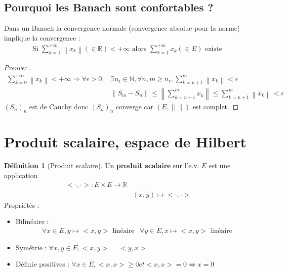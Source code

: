 \documentclass{article}
\theoremstyle{plain}%
\theoremstyle{definition}
\newtheorem{defn}{Définition}[section]
\theoremstyle{remark}
\begin{document}
\subsection{Pourquoi les Banach sont confortables ?}

Dans un Banach la convergence normale (convergence absolue pour la norme) implique la convergence : 
\begin{align*}
	\text{Si } \sum_{k=1}^{+\infty } \left\| x_k \right\| (\in \mathbb{R}) < + \infty \text{ alors } \sum_{k=1}^{+\infty} x_k (\in E)\text{ existe }
\end{align*}

\begin{proof}[Preuve: ]
	\begin{align*}
		\sum_{k=0}^{+\infty } \left\| x_k \right\| < + \infty \Rightarrow \forall \epsilon > 0, &\exists n_\epsilon \in \mathbb{N}, \forall n,m \geq n_\epsilon, \sum_{k=n+1}^{m} \left\| x_k \right\| < \epsilon \\
		& \left\| S_m - S_n \right\| \leq \left\| \sum_{k=n+1}^{m}x_k \right\| \leq \sum_{k=n+1}^{m} \left\| x_k \right\| < \epsilon
	\end{align*}
	$ (S_n)_n $ est de Cauchy donc $ (S_n)_n $ converge car $ (E, \left\|  \right\| ) $ est complet.
\end{proof}

\section{Produit scalaire, espace de Hilbert}

\begin{defn}[Produit scalaire]
	Un \textbf{produit scalaire} sur l'e.v. $ E $ est une application 
	\begin{align*}
		< \cdot , \cdot > : E \times E \to \mathbb{R} \\
			& (x,y) \mapsto < \cdot , \cdot >
	\end{align*}
	Propriétés : 
	\begin{itemize}
		\item Bilinéaire : 
		\begin{align*}
			& \forall x \in E, y \mapsto < x , y > \text{ linéaire}
			& \forall y \in E, x \mapsto < x , y > \text{ linéaire}
		\end{align*}
		\item Symétrie : $ \forall x,y \in E, < x , y > = < y, x > $ 
		\item Définie positives : $ \forall x \in E, <x,x> \geq 0 et <x,x>=0 \Leftrightarrow x=0 $ 
	\end{itemize}
\end{defn}
\end{document}
